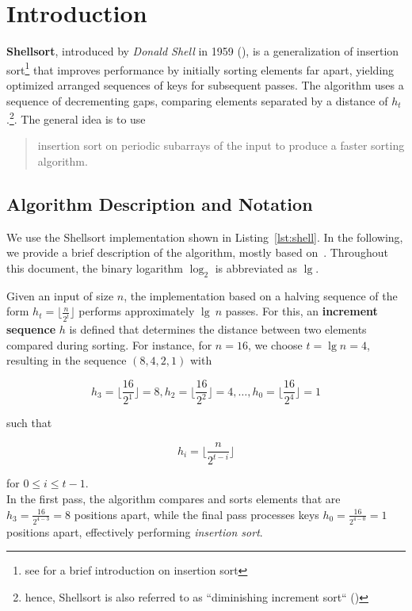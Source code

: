 \section{Introduction}

\textbf{Shellsort}, introduced by \textit{Donald Shell} in 1959 (\cite[]{She59}), is a generalization of insertion sort\footnote{
see \cite[250]{SW11} for a brief introduction on insertion sort
} that improves performance by initially sorting elements far apart, yielding optimized arranged sequences of keys for subsequent passes.
The algorithm uses a sequence of decrementing gaps, comparing elements separated by a distance of $h_t$.\footnote{
hence, Shellsort is also referred to as ``diminishing increment sort`` (\cite[88]{OW17b})
}.
The general idea is to use \blockquote[{\cite[48]{CL22}}]{
    insertion sort on periodic subarrays of the input
    to produce a faster sorting algorithm.
}

\subsection{Algorithm Description and Notation}
We use the Shellsort implementation shown in Listing~\ref{lst:shell}.
In the following, we provide a brief description of the algorithm, mostly based on~\cite[84]{Knu97b}.
Throughout this document, the binary logarithm $\log_2$ is abbreviated as $\lg$.


Given an input of size $n$, the implementation based on a halving sequence of the form $h_t = \lfloor \frac{n}{2^t} \rfloor$ performs approximately $\lg\ n$ passes.
For this, an \textbf{increment sequence} $h$ is defined that determines the distance between two elements compared during sorting.
For instance, for $n = 16$, we choose $t=\lg n = 4$, resulting in the sequence $(8, 4, 2, 1)$ with

\[
    h_{3} = \lfloor\frac{16}{2^1}\rfloor = 8, h_{2} = \lfloor\frac{16}{2^2}\rfloor = 4, \ldots , h_{0} = \lfloor\frac{16}{2^4}\rfloor = 1
\]

such that

\[
    h_i = \lfloor {\frac{n}{2^{t-i}}} \rfloor
\]

for $0 \leq i \leq t - 1$.\\

In the first pass, the algorithm compares and sorts elements that are $h_{3} = \frac{16}{2^{4-3}} = 8$ positions apart, while the final pass processes keys $h_0 = \frac{16}{2^{4-0}} = 1$ positions apart, effectively performing \textit{insertion sort}.\\

